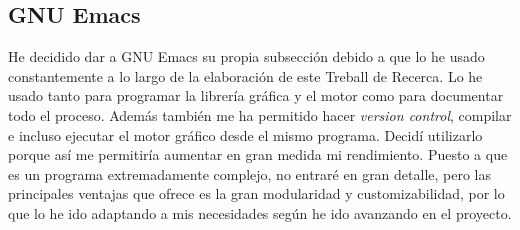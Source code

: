 \subsection{GNU Emacs}
He decidido dar a GNU Emacs su propia subsección debido a que lo he usado constantemente a lo largo de la elaboración de este Treball de Recerca. Lo he usado tanto para programar la librería gráfica y el motor como para documentar todo el proceso. Además también me ha permitido hacer \textit{version control}, compilar e incluso ejecutar el motor gráfico desde el mismo programa. Decidí utilizarlo porque así me permitiría aumentar en gran medida mi rendimiento. Puesto a que es un programa extremadamente complejo, no entraré en gran detalle, pero las principales ventajas que ofrece es la gran modularidad y customizabilidad, por lo que lo he ido adaptando a mis necesidades según he ido avanzando en el proyecto.
